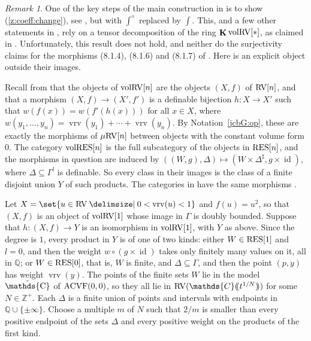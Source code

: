 \documentclass[12pt]{amsart}
\theoremstyle{plain}
\theoremstyle{definition}
\theoremstyle{remark}
\newtheorem{rem}[thm]{Remark}
\numberwithin{equation}{section}
\theoremstyle{plain}
\newcommand{\ACVF}{\textup{ACVF}}
\newcommand{\RV}{\textup{RV}}
\DeclareMathOperator{\id}{id}
\newcommand{\Z}{\mathds{Z}}
\newcommand{\C}{\mathds{C}}
\newcommand{\Q}{\mathds{Q}}
\newcommand{\0}{\emptyset}
\newcommand{\dpar}[1]{%
   (\mkern-4mu (#1 )\mkern-4mu )}
\newcommand{\fun}{\longrightarrow}
\newcommand{\efun}{\longmapsto}
\newcommand{\sub}{\subseteq}
\providecommand\given{}
\newcommand\SetSymbol[1][]{%
\nonscript \: #1 \vert
\allowbreak
\nonscript\:
\mathopen{}}
\renewcommand\given{\SetSymbol[\delimsize]}
\newcommand{\mgRV}{{\mu}{\RV}}
\newcommand{\RES}{\textup{RES}}
\DeclareMathOperator{\ggk}{\mathbf{K}}
\DeclareMathOperator{\vrv}{vrv}
\DeclareMathOperator{\puC}{\tilde \C}
\begin{document}
\begin{rem}\label{rem:HK:fail}
One of the key steps of the main construction in \cite[\S~8]{hru:loe:lef} is to show (\ref{z:coeff:change}), see \cite[Proposition~8.3.1]{hru:loe:lef}, but with $\int^\diamond$  replaced by $\int$. This, and a few other statements in \cite[\S~8]{hru:loe:lef}, rely on a tensor decomposition of the ring $\ggk \mathrm{vol}\RV[*]$, as claimed in \cite[Proposition~10.10(2)]{hrushovski:kazhdan:integration:vf}. Unfortunately, this result does not hold, and neither do the surjectivity claims for the morphisms (8.1.4), (8.1.6) and (8.1.7) of \cite{hru:loe:lef}. Here is an explicit object outside their images.

Recall from \cite[\S~8.1]{hru:loe:lef} that the objects of $\mathrm{vol}\RV[n]$ are the objects $(X, f)$ of $\RV[n]$, and that a morphism $(X, f) \fun (X', f')$ is a definable bijection $h : X \fun X'$ such that $w(f(x)) = w(f'(h(x)))$ for all $x \in X$, where $w(y_1, \ldots, y_n) = \vrv(y_1) + \cdots + \vrv(y_n)$. By Notation~\ref{jcbG:op}, these are exactly the morphisms of $\mgRV[n]$ between objects with the constant volume form $0$. The category $\mathrm{vol}\RES[n]$ is the full subcategory of the objects in $\RES[n]$, and the morphisms in question are induced by $((W, g), \Delta) \efun (W \times \Delta^\sharp, g \times \id)$, where $\Delta \sub \Gamma^l$ is definable. So every class in their images is the class of a finite disjoint union $Y$ of such products. The categories in \cite[Proposition~10.10(2)]{hrushovski:kazhdan:integration:vf} have the same morphisms \cite[Definition~5.21]{hrushovski:kazhdan:integration:vf}.

Let $X = \set{u \in \RV \given 0 < \vrv(u) < 1}$ and $f(u) = u^2$, so that $(X, f)$ is an object of $\mathrm{vol}\RV[1]$ whose image in $\Gamma$ is doubly bounded. Suppose that $h : (X, f) \fun Y$ is an isomorphism in $\mathrm{vol}\RV[1]$, with $Y$ as above. Since the degree is $1$, every product in $Y$ is of one of two kinds: either $W \in \RES[1]$ and $l = 0$, and then the weight $w \circ (g \times \id)$ takes only finitely many values on it, all in $\Q$; or $W \in \RES[0]$, that is, $W$ is finite, and $\Delta \sub \Gamma$, and then the point $(p, y)$ has weight $\vrv(y)$. The points of the finite sets $W$ lie in the model $\puC$ of $\ACVF(0,0)$, so they all lie in $\RV(\C\dpar{t^{1/N}})$ for some $N \in \Z^+$. Each $\Delta$ is a finite union of points and intervals with endpoints in $\Q \cup \{\pm\infty\}$. Choose a multiple $m$ of $N$ such that $2/m$ is smaller than every positive endpoint of the sets $\Delta$ and every positive weight on the products of the first kind.


\end{rem}
\end{document}
